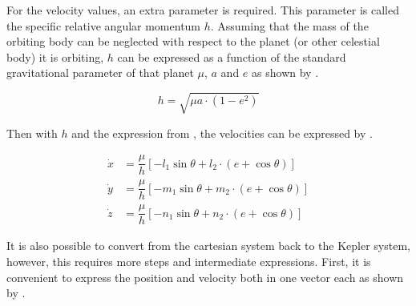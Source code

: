 \noindent 
For the velocity values, an extra parameter is required. This parameter is called the specific relative angular momentum $h$. Assuming that the mass of the orbiting body can be neglected with respect to the planet (or other celestial body) it is orbiting, $h$ can be expressed as a function of the standard gravitational parameter of that planet $\mu$, $a$ and $e$ as shown by .



\begin{equation}\label{eq:anglmomhktoc}
h=\sqrt{\mu a\cdot\left(1-e^{2}\right)}
\end{equation}   

\noindent
Then with $h$ and the expression from , the velocities can be expressed by .

\begin{equation}\label{eq:keptocartv}
\begin{split}
 \dot{x}&=\dfrac{\mu}{h}\left[-l_{1}\sin\theta +l_{2}\cdot\left(e+\cos\theta \right)\right]\\
 \dot{y}&=\dfrac{\mu}{h}\left[-m_{1}\sin\theta +m_{2}\cdot\left(e+\cos\theta \right)\right]\\
 \dot{z}&=\dfrac{\mu}{h}\left[-n_{1}\sin\theta +n_{2}\cdot\left(e+\cos\theta \right)\right]
\end{split}
\end{equation}


\noindent
It is also possible to convert from the cartesian system back to the Kepler system, however, this requires more steps and intermediate expressions. First, it is convenient to express the position and velocity both in one vector each as shown by .

